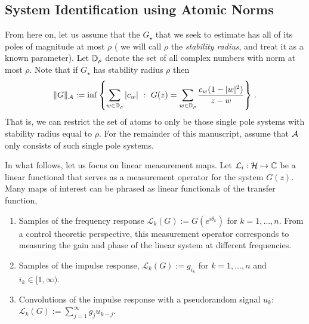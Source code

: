 \subsection{System Identification using Atomic Norms}\label{sec:computation}

From here on, let us assume that the $G_\star$ that we seek to estimate has all
of its poles of magnitude at most $\rho$ ( we will call $\rho$ the
\emph{stability radius}, and treat it as a known parameter). Let $\mathbb{D}_\rho$
denote the set of all complex numbers with norm at most $\rho$. Note that if
$G_\star$ has stability radius $\rho$ then
\[
	\|G\|_{\mathcal{A}}:=\inf\left\{ \sum_{w\in \mathbb{D}_\rho} |c_w|~:~G(z) = \sum_{w\in \mathbb{D}_\rho} \frac{c_w (1-|w|^2)}{z-w}\right\}\,.
\]
That is, we can restrict the set of atoms to only be those single pole systems with stability radius equal to $\rho$.  For the remainder of this manuscript,  assume that $\mathcal{A}$ only consists of such single pole systems.

In what follows, let us focus on linear measurement maps.  Let $\mathcal{L}_i: \mathcal{H} \mapsto \mathbb{C} $ be a linear functional that serves as a measurement operator for the system $G(z)$.  Many maps of interest can be phrased as linear functionals of the transfer function,
\begin{enumerate}
	\item Samples of the frequency response $\mathcal{L}_k(G):=G(e^{i\theta_k})$ for $k=1,\ldots, n$.  From a control theoretic perspective, this measurement operator corresponds to measuring the gain and phase of the linear system at different frequencies.
	\item Samples of the impulse response, $\mathcal{L}_k(G):=g_{i_k}$ for $k=1,\ldots, n$ and $i_k \in [1,\infty)$.
	\item Convolutions of the impulse response with a pseudorandom signal $u_k$: $\mathcal{L}_k(G):=\sum_{j=1}^{\infty} g_j u_{k-j}$.
\end{enumerate}

